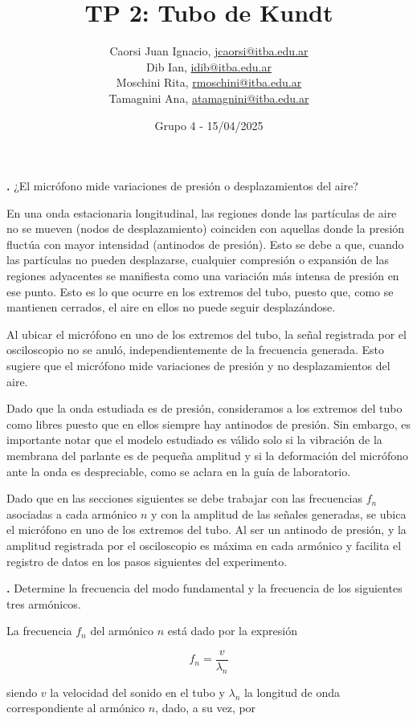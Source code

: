 \documentclass[12pt, a4paper]{article}
\title{TP 2: Tubo de Kundt}
\author
{
  Caorsi Juan Ignacio, \href{jcaorsi@itba.edu.ar}{jcaorsi@itba.edu.ar} \\
  Dib Ian, \href{idib@itba.edu.ar}{idib@itba.edu.ar} \\
  Moschini Rita, \href{rmoschini@itba.edu.ar}{rmoschini@itba.edu.ar} \\
  Tamagnini Ana, \href{atamagnini@itba.edu.ar}{atamagnini@itba.edu.ar}
}
\date{Grupo 4 - 15/04/2025}
\newcounter{step}
\newcommand{\step}[1]
{
  \par\vspace{2ex}
  \stepcounter{step}
  \noindent\textbf{\arabic{step}.} #1\par\vspace{1ex}
}
\begin{document}
\maketitle

\step{¿El micrófono mide variaciones de presión o desplazamientos del aire?}

En una onda estacionaria longitudinal, las regiones donde las partículas de aire no se mueven (nodos de desplazamiento) coinciden con aquellas donde la presión fluctúa con mayor intensidad (antinodos de presión). Esto se debe a que, cuando las partículas no pueden desplazarse, cualquier compresión o expansión de las regiones adyacentes se manifiesta como una variación más intensa de presión en ese punto. Esto es lo que ocurre en los extremos del tubo, puesto que, como se mantienen cerrados, el aire en ellos no puede seguir desplazándose.

Al ubicar el micrófono en uno de los extremos del tubo, la señal registrada por el osciloscopio no se anuló, independientemente de la frecuencia generada. Esto sugiere que el micrófono mide variaciones de presión y no desplazamientos del aire.

Dado que la onda estudiada es de presión, consideramos a los extremos del tubo como libres puesto que en ellos siempre hay antinodos de presión. Sin embargo, es importante notar que el modelo estudiado es válido solo si la vibración de la membrana del parlante es de pequeña amplitud y si la deformación del micrófono ante la onda es despreciable, como se aclara en la guía de laboratorio.

Dado que en las secciones siguientes se debe trabajar con las frecuencias $f_{n}$ asociadas a cada armónico $n$ y con la amplitud de las señales generadas, se ubica el micrófono en uno de los extremos del tubo. Al ser un antinodo de presión, y la amplitud registrada por el osciloscopio es máxima en cada armónico y facilita el registro de datos en los pasos siguientes del experimento.


\step{Determine la frecuencia del modo fundamental y la frecuencia de los siguientes tres armónicos.}

La frecuencia $f_{n}$ del armónico $n$ está dado por la expresión

\begin{equation}
    f_{n} = \frac{v}{\lambda_{n}}
  \label{equation1}
\end{equation}

siendo $v$ la velocidad del sonido en el tubo y $\lambda_{n}$ la longitud de onda correspondiente al armónico $n$, dado, a su vez, por
\end{document}
